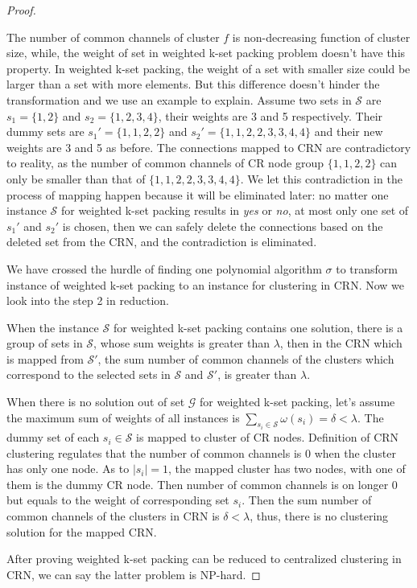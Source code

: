 \begin{proof}
\begin{itemize}
The number of common channels of cluster $f$ is non-decreasing function of cluster size, while, the weight of set in weighted k-set packing problem doesn't have this property.
In weighted k-set packing, the weight of a set with smaller size could be larger than a set with more elements.
But this difference doesn't hinder the transformation and we use an example to explain.
Assume two sets in $\mathcal{S}$ are $s_1=\{1,2\}$ and $s_2=\{1,2,3,4\}$, their weights are 3 and 5 respectively.
Their dummy sets are $s_1'=\{1,1,2,2\}$ and $s_2'=\{1,1,2,2,3,3,4,4\}$ and their new weights are 3 and 5 as before.
The connections mapped to CRN are contradictory to reality, as the number of common channels of CR node group $\{1,1,2,2\}$ can only be smaller than that of $\{1,1,2,2,3,3,4,4\}$.
We let this contradiction in the process of mapping happen because it will be eliminated later: no matter one instance $\mathcal{S}$ for weighted k-set packing results in \textit{yes} or \textit{no}, at most only one set of $s_1'$ and $s_2'$ is chosen, then we can safely delete the connections based on the deleted set from the CRN, and the contradiction is eliminated.
\end{itemize}






We have crossed the hurdle of finding one polynomial algorithm $\sigma$ to transform instance of weighted k-set packing to an instance for clustering in CRN.
Now we look into the step 2 in reduction.

When the instance $\mathcal{S}$ for weighted k-set packing contains one solution, \ie there is a group of sets in $\mathcal{S}$, whose sum weights is greater than $\lambda$, then in the CRN which is mapped from $\mathcal{S}'$, the sum number of common channels of the clusters which correspond to the selected sets in $\mathcal{S}$ and $\mathcal{S}'$, is greater than $\lambda$.

When there is no solution out of set $\mathcal{G}$ for weighted k-set packing, let's assume the maximum sum of weights of all instances is $\sum_{s_i\in \mathcal{S}}\omega(s_i)=\delta < \lambda$. 
The dummy set of each $s_i\in \mathcal{S}$ is mapped to cluster of CR nodes.
Definition of CRN clustering regulates that the number of common channels is 0 when the cluster has only one node.
As to $|s_i|=1$, the mapped cluster has two nodes, with one of them is the dummy CR node.
Then number of common channels is on longer 0 but equals to the weight of corresponding set $s_i$.
Then the sum number of common channels of the clusters in CRN is $\delta < \lambda$, thus, there is no clustering solution for the mapped CRN.



After proving weighted k-set packing can be reduced to centralized clustering in CRN, we can say the latter problem is NP-hard.
\end{proof}


